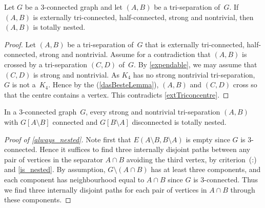 \documentclass{aic}
\theoremstyle{plain}
\theoremstyle{definition}
\theoremstyle{plain}
\theoremstyle{plain}
\newcommand{\sm}{\setminus}
\begin{document}
\begin{prop}
\label{is_nested}
Let $G$ be a 3-connected graph and let $(A,B)$ be a tri-sepa\-ra\-tion of~$G$.
If $(A,B)$ is externally tri-connected, half-connected, strong and nontrivial, then $(A,B)$ is totally nested.
\end{prop}
\begin{proof}
Let $(A,B)$ be a tri-separation of~$G$ that is externally tri-connected, half-connected, strong and nontrivial.
Assume for a contradiction that $(A,B)$ is crossed by a tri-separation $(C,D)$ of~$G$.
By \autoref{expendable}, we may assume that $(C,D)$ is strong and nontrivial.
As $K_4$ has no strong nontrivial tri-separation, $G$ is not a~$K_4$.
Hence by the  (\ref{dasBesteLemma}), $(A,B)$ and $(C,D)$ cross so that the centre contains a vertex.
This contradicts \autoref{extTriconcentre}.
\end{proof}


\begin{eg}\label{always_nested}
In a 3-connected graph~$G$, every strong and nontrivial tri-separation $(A,B)$ with $G[A\sm B]$ connected and 
$G[B\sm A]$ 
disconnected is totally nested.
\end{eg}
\begin{proof}[Proof of \autoref{always_nested}]
Note first that $E(A\sm B,B\sm A)$ is empty since $G$ is 3-connected.
Hence it suffices to find three internally disjoint paths between any pair of vertices in the 
separator $A\cap B$ avoiding the third vertex, by criterion~(:) and \autoref{is_nested}.
By assumption, \mbox{$G\sm (A\cap B)$} has at least three components, and each component has 
neighbourhood 
equal to $A\cap B$ since $G$ is 3-connected.
Thus we find three internally disjoint paths for each pair of vertices in $A\cap B$ through these 
components.
\end{proof}
\end{document}
